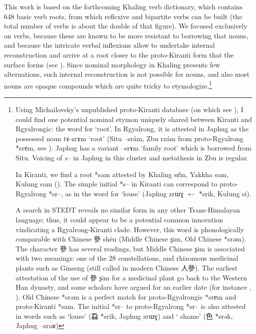 \documentclass[oldfontcommands,oneside,a4paper,11pt]{article}
\newcommand{\ipa}[1]{{\phon #1}} %
\newcommand{\zh}[1]{{\cn #1}}
\begin{document}
This work is based on the forthcoming Khaling verb dictionary, which contains 648 basic verb roots, from which reflexive and bipartite verbs can be built (the total number of verbs is about the double of that figure). We focused exclusively on verbs, because these are known to be more resistant to borrowing that nouns, and because the intricate verbal inflexions allow to undertake internal reconstruction and arrive at a root closer to the proto-Kiranti form that the surface forms (see \citealt{jacques12khaling}). Since nominal morphology in Khaling presents few alternations, such internal reconstruction is not possible for nouns, and also most nouns are opaque compounds which are quite tricky to etymologize.\footnote{
Using Michailovsky's unpublished proto-Kiranti  database (on which see  \citealt{michailovsky10kiranti}), I could find one potential nominal etymon uniquely shared between Kiranti and Rgyalrongic: the word for `root'. In Rgyalrong, it is attested in Japhug as the possessed noun \ipa{tɤ-zrɤm} `root' (Situ \ipa{--srám}, Zbu \ipa{rzám} from proto-Rgyalrong *srɐm, see \citealt[243]{jacques04these}). Japhug has a variant \ipa{--srɤm} `family root' which is borrowed from Situ. Voicing of \textit{s--} in Japhug in this cluster and metathesis in Zbu is regular.

In Kiranti, we find a root *sam attested by Khaling \ipa{sɛ̄m}, Yakkha  \ipa{sam}, Kulung \ipa{sam} (\citealt{tolsma06kulung}). The simple initial *s-- in Kiranti can correspond to proto-Rgyalrong *sr--, as in the word for `louse' (Japhug \ipa{zrɯɣ} $\leftarrow$ *srik, Kulung \ipa{si}).

A search in STEDT reveals no similar form in any other Trans-Himalayan language; thus, it could appear to be a potential common innovation vindicating a Rgyalrong-Kiranti clade. However, this word is phonologically comparable with Chinese \zh{參} shēn (Middle Chinese \ipa{ʂim}, Old Chinese *srəm). The character  \zh{參} has several readings, but Middle Chinese \ipa{ʂim} is associated with two meanings: one of the 28 constellations, and rhizomous medicinal plants such as Ginseng (still called in modern Chinese \zh{人參}). The earliest attestation of the use of \zh{參} \ipa{ʂim} for a medicinal plant go back to the Western Han dynasty, and some scholars have argued for an earlier date (for instance \citealt{xu11shen}, \citealt{sun92renshen}). Old Chinese *srəm is a perfect match for proto-Rgyalrongic *srɐm and proto-Kiranti *sam. The initial *sr-- to proto-Rgyalrong *sr-- is also attested in words such as `louse' (\zh{蝨} *srik, Japhug \ipa{zrɯɣ}) and ` shame' (\zh{色} *srək, Japhug \ipa{--zraʁ})

}
\end{document}
